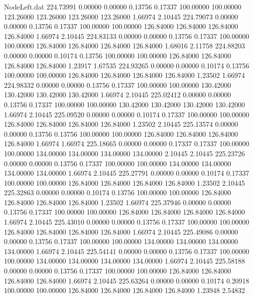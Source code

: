 \begin{filecontents}{NodeLeft.dat}
 224.73991    0.00000    0.00000     0.13756    0.17337  100.00000  100.00000  123.26000  123.26000  123.26000  123.26000    1.66974    2.10445
 224.79073    0.00000    0.00000     0.13756    0.17337  100.00000  100.00000  126.84000  126.84000  126.84000  126.84000    1.66974    2.10445
 224.83133    0.00000    0.00000     0.13756    0.17337  100.00000  100.00000  126.84000  126.84000  126.84000  126.84000    1.68016    2.11758
 224.88203    0.00000    0.00000     0.10174    0.13756  100.00000  100.00000  126.84000  126.84000  126.84000  126.84000    1.23917    1.67535
 224.93265    0.00000    0.00000     0.10174    0.13756  100.00000  100.00000  126.84000  126.84000  126.84000  126.84000    1.23502    1.66974
 224.98332    0.00000    0.00000     0.13756    0.17337  100.00000  100.00000  130.42000  130.42000  130.42000  130.42000    1.66974    2.10445
 225.02412    0.00000    0.00000     0.13756    0.17337  100.00000  100.00000  130.42000  130.42000  130.42000  130.42000    1.66974    2.10445
 225.09520    0.00000    0.00000     0.10174    0.17337  100.00000  100.00000  126.84000  126.84000  126.84000  126.84000    1.23502    2.10445
 225.13574    0.00000    0.00000     0.13756    0.13756  100.00000  100.00000  126.84000  126.84000  126.84000  126.84000    1.66974    1.66974
 225.18665    0.00000    0.00000     0.17337    0.17337  100.00000  100.00000  134.00000  134.00000  134.00000  134.00000    2.10445    2.10445
 225.23726    0.00000    0.00000     0.13756    0.17337  100.00000  100.00000  134.00000  134.00000  134.00000  134.00000    1.66974    2.10445
 225.27791    0.00000    0.00000     0.10174    0.17337  100.00000  100.00000  126.84000  126.84000  126.84000  126.84000    1.23502    2.10445
 225.32863    0.00000    0.00000     0.10174    0.13756  100.00000  100.00000  126.84000  126.84000  126.84000  126.84000    1.23502    1.66974
 225.37946    0.00000    0.00000     0.13756    0.17337  100.00000  100.00000  126.84000  126.84000  126.84000  126.84000    1.66974    2.10445
 225.43010    0.00000    0.00000     0.13756    0.17337  100.00000  100.00000  126.84000  126.84000  126.84000  126.84000    1.66974    2.10445
 225.49086    0.00000    0.00000     0.13756    0.17337  100.00000  100.00000  134.00000  134.00000  134.00000  134.00000    1.66974    2.10445
 225.54141    0.00000    0.00000     0.13756    0.17337  100.00000  100.00000  134.00000  134.00000  134.00000  134.00000    1.66974    2.10445
 225.58188    0.00000    0.00000     0.13756    0.17337  100.00000  100.00000  126.84000  126.84000  126.84000  126.84000    1.66974    2.10445
 225.63264    0.00000    0.00000     0.10174    0.20918  100.00000  100.00000  126.84000  126.84000  126.84000  126.84000    1.23948    2.54832

\end{filecontents}
